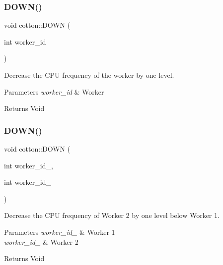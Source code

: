 \subsubsection{\texorpdfstring{D\+O\+W\+N()}{DOWN()}\hspace{0.1cm}{\footnotesize\ttfamily [1/2]}}
{\footnotesize\ttfamily void cotton\+::\+D\+O\+WN (\begin{DoxyParamCaption}\item[{int}]{worker\+\_\+id }\end{DoxyParamCaption})}

Decrease the C\+PU frequency of the worker by one level.


\begin{DoxyParams}{Parameters}
{\em worker\+\_\+id} & Worker\\
\hline
\end{DoxyParams}
\begin{DoxyReturn}{Returns}
Void 
\end{DoxyReturn}
\mbox{\label{cotton-runtime_8h_file_a5b31e108dfdf198f421dab591cb009fc}} 
\subsubsection{\texorpdfstring{D\+O\+W\+N()}{DOWN()}\hspace{0.1cm}{\footnotesize\ttfamily [2/2]}}
{\footnotesize\ttfamily void cotton\+::\+D\+O\+WN (\begin{DoxyParamCaption}\item[{int}]{worker\+\_\+id\+\_,  }\item[{int}]{worker\+\_\+id\+\_ }\end{DoxyParamCaption})}

Decrease the C\+PU frequency of Worker 2 by one level below Worker 1.


\begin{DoxyParams}{Parameters}
{\em worker\+\_\+id\+\_} & Worker 1 \\
\hline
{\em worker\+\_\+id\+\_} & Worker 2\\
\hline
\end{DoxyParams}
\begin{DoxyReturn}{Returns}
Void 
\end{DoxyReturn}
\mbox{\label{cotton-runtime_8h_file_a824fc414cfcf95d0d928f9736490ab41}} 
